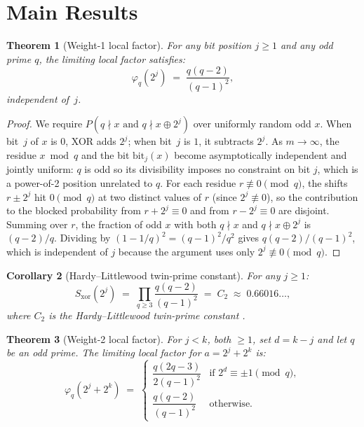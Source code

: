\documentclass[12pt]{article}
\newtheorem{theorem}{Theorem}
\newtheorem{corollary}[theorem]{Corollary}
\begin{document}
\section{Main Results}
\label{sec:results}

\begin{theorem}[Weight-1 local factor]
\label{thm:weight1}
For any bit position $j \geq 1$ and any odd prime $q$,
the limiting local factor satisfies:
\[
  \varphi_q(2^j)
  \;=\;
  \frac{q(q-2)}{(q-1)^2},
\]
independent of~$j$.
\end{theorem}

\begin{proof}
We require $P(q \nmid x \text{ and } q \nmid x \oplus 2^j)$
over uniformly random odd $x$.
When bit~$j$ of $x$ is $0$, XOR adds $2^j$; when bit~$j$ is $1$, it subtracts $2^j$.
As $m \to \infty$, the residue $x \bmod q$ and the bit $\mathrm{bit}_j(x)$
become asymptotically independent and jointly uniform:
$q$ is odd so its divisibility imposes no constraint on bit $j$, which is a
power-of-2 position unrelated to $q$.
For each residue $r \not\equiv 0 \pmod{q}$,
the shifts $r \pm 2^j$ hit $0 \pmod q$ at two distinct values of $r$
(since $2^j \not\equiv 0$), so the contribution to the blocked probability
from $r + 2^j \equiv 0$ and from $r - 2^j \equiv 0$ are disjoint.
Summing over $r$, the fraction of odd $x$ with both $q \nmid x$ and
$q \nmid x \oplus 2^j$ is $(q-2)/q$.
Dividing by $(1-1/q)^2 = (q-1)^2/q^2$ gives $q(q-2)/(q-1)^2$,
which is independent of $j$ because the argument uses only $2^j \not\equiv 0 \pmod{q}$.
\end{proof}

\begin{corollary}[Hardy--Littlewood twin-prime constant]
\label{cor:C2}
For any $j \geq 1$:
\[
  S_{\mathrm{xor}}(2^j)
  \;=\;
  \prod_{q \geq 3} \frac{q(q-2)}{(q-1)^2}
  \;=\;
  C_2 \;\approx\; 0.66016\ldots,
\]
where $C_2$ is the Hardy--Littlewood twin-prime constant \citep{hardylittlewood1923}.
\end{corollary}

\begin{theorem}[Weight-2 local factor]
\label{thm:weight2}
For $j < k$, both $\geq 1$, set $d = k - j$ and let $q$ be an odd prime.
The limiting local factor for $a = 2^j + 2^k$ is:
\[
  \varphi_q(2^j + 2^k)
  \;=\;
  \begin{cases}
    \dfrac{q(2q-3)}{2(q-1)^2}
      & \text{if } 2^d \equiv \pm 1 \pmod{q}, \\[8pt]
    \dfrac{q(q-2)}{(q-1)^2}
      & \text{otherwise.}
  \end{cases}
\]
\end{theorem}
\end{document}
